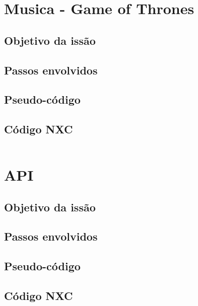 \documentclass{article}
\begin{document}
\newpage
\section{Musica - Game of Thrones}
	\subsection{Objetivo da issão}
	\subsection{Passos envolvidos}
	\subsection{Pseudo-código}
	\subsection{Código NXC}
		\begin{tcolorbox}[]
			\inputminted{c}{codes/music_game_of_thrones.nxc}
		\end{tcolorbox}

\newpage
\section{API}
	\subsection{Objetivo da issão}
	\subsection{Passos envolvidos}
	\subsection{Pseudo-código}
	\subsection{Código NXC}
		\begin{tcolorbox}[]
			\inputminted{c}{codes/the_bug_api.c}
		\end{tcolorbox}
		
		\begin{tcolorbox}[]
			\inputminted{c}{codes/the_bug_api.h}
		\end{tcolorbox}

\newpage
\end{document}
